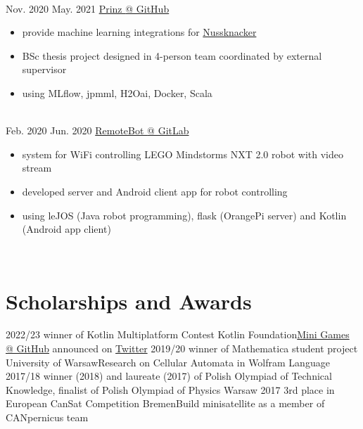 \documentclass[a4paper]{twentysecondcv} %
\begin{document}
\begin{twenty}
        \\
        \twentyitem
        {Nov. 2020}
        {May. 2021}
        {\href{https://github.com/prinz-nussknacker/prinz}{Prinz {\footnotesize @ GitHub}}}
        {}
        {}
        {\begin{itemize}
             \item provide machine learning integrations for \href{https://github.com/TouK/nussknacker}{Nussknacker}
             \item BSc thesis project designed in 4-person team coordinated by external supervisor
             \item using MLflow, jpmml, H2Oai, Docker, Scala
        \end{itemize}}
        \\
        \twentyitem
        {Feb. 2020}
        {Jun. 2020}
        {\href{https://gitlab.com/avan1235/remotebot}{RemoteBot {\footnotesize @ GitLab}}}
        {}
        {}
        {\begin{itemize}
             \item system for WiFi controlling LEGO Mindstorms NXT 2.0 robot with video stream
             \item developed server and Android client app for robot controlling
             \item using leJOS (Java robot programming), flask (OrangePi server) and Kotlin (Android app client)
        \end{itemize}}
        \\
    \end{twenty}

    \vspace{-0.6cm}

    \section{Scholarships and Awards}
    \begin{twenty}
        \twentyitem
        {2022/23}
        {}
        {winner of Kotlin Multiplatform Contest}
        {Kotlin Foundation}{\href{https://github.com/avan1235/mini-games}{Mini Games {\footnotesize @ GitHub}} announced on \href{https://twitter.com/kotlinconf/status/1616430150836445184}{Twitter}}{}
        \twentyitem
        {2019/20}
        {}
        {winner of Mathematica student project}
        {University of Warsaw}{Research on Cellular Automata in Wolfram Language}{}
        \twentyitem
        {2017/18}
        {}
        {winner (2018) and laureate (2017) of Polish Olympiad of Technical Knowledge, finalist of Polish Olympiad of Physics}
        {Warsaw}{}{}
        \twentyitem
        {2017}
        {}
        {3rd place in European CanSat Competition}
        {Bremen}{Build minisatellite as a member of CANpernicus team}{}
    \end{twenty}


%
\end{document}
